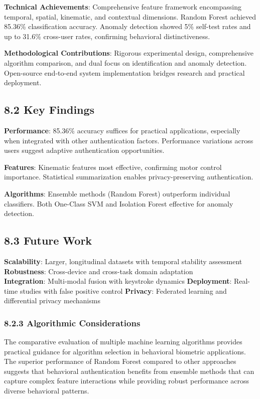 \documentclass[
  11pt,
  a4paper,
]{article}
\begin{document}
\textbf{Technical Achievements}: Comprehensive feature framework
encompassing temporal, spatial, kinematic, and contextual dimensions.
Random Forest achieved 85.36\% classification accuracy. Anomaly
detection showed 5\% self-test rates and up to 31.6\% cross-user rates,
confirming behavioral distinctiveness.

\textbf{Methodological Contributions}: Rigorous experimental design,
comprehensive algorithm comparison, and dual focus on identification and
anomaly detection. Open-source end-to-end system implementation bridges
research and practical deployment.

\subsection{8.2 Key Findings}\label{key-findings-1}

\textbf{Performance}: 85.36\% accuracy suffices for practical
applications, especially when integrated with other authentication
factors. Performance variations across users suggest adaptive
authentication opportunities.

\textbf{Features}: Kinematic features most effective, confirming motor
control importance. Statistical summarization enables privacy-preserving
authentication.

\textbf{Algorithms}: Ensemble methods (Random Forest) outperform
individual classifiers. Both One-Class SVM and Isolation Forest
effective for anomaly detection.

\subsection{8.3 Future Work}\label{future-work-1}

\textbf{Scalability}: Larger, longitudinal datasets with temporal
stability assessment \textbf{Robustness}: Cross-device and cross-task
domain adaptation\\
\textbf{Integration}: Multi-modal fusion with keystroke dynamics
\textbf{Deployment}: Real-time studies with false positive control
\textbf{Privacy}: Federated learning and differential privacy mechanisms

\subsubsection{8.2.3 Algorithmic
Considerations}\label{algorithmic-considerations}

The comparative evaluation of multiple machine learning algorithms
provides practical guidance for algorithm selection in behavioral
biometric applications. The superior performance of Random Forest
compared to other approaches suggests that behavioral authentication
benefits from ensemble methods that can capture complex feature
interactions while providing robust performance across diverse
behavioral patterns.
\end{document}
